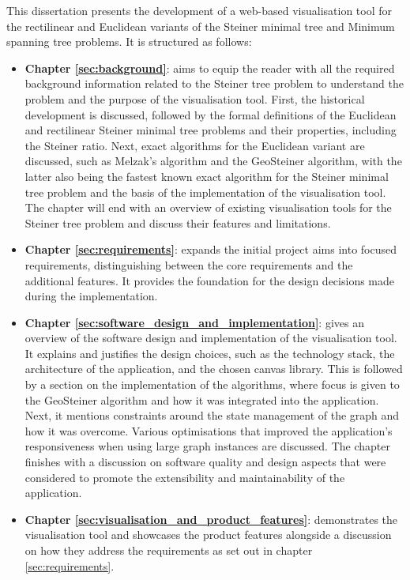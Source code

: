 \documentclass{l4proj}
\begin{document}
This dissertation presents the development of a web-based visualisation tool for the rectilinear and Euclidean variants of the Steiner minimal tree and Minimum spanning tree problems. It is structured as follows:
\begin{itemize}
    \item \textbf{Chapter \ref{sec:background}}: aims to equip the reader with all the required background information related to the Steiner tree problem to understand the problem and the purpose of the visualisation tool. First, the historical development is discussed, followed by the formal definitions of the Euclidean and rectilinear Steiner minimal tree problems and their properties, including the Steiner ratio. Next, exact algorithms for the Euclidean variant are discussed, such as Melzak's algorithm and the GeoSteiner algorithm, with the latter also being the fastest known exact algorithm for the Steiner minimal tree problem and the basis of the implementation of the visualisation tool. The chapter will end with an overview of existing visualisation tools for the Steiner tree problem and discuss their features and limitations.
    \item \textbf{Chapter \ref{sec:requirements}}: expands the initial project aims into focused requirements, distinguishing between the core requirements and the additional features. It provides the foundation for the design decisions made during the implementation.
    \item \textbf{Chapter \ref{sec:software_design_and_implementation}}: gives an overview of the software design and implementation of the visualisation tool. It explains and justifies the design choices, such as the technology stack, the architecture of the application, and the chosen canvas library. This is followed by a section on the implementation of the algorithms, where focus is given to the GeoSteiner algorithm and how it was integrated into the application. Next, it mentions constraints around the state management of the graph and how it was overcome. Various optimisations that improved the application's responsiveness when using large graph instances are discussed. The chapter finishes with a discussion on software quality and design aspects that were considered to promote the extensibility and maintainability of the application.
    \item \textbf{Chapter \ref{sec:visualisation_and_product_features}}: demonstrates the visualisation tool and showcases the product features alongside a discussion on how they address the requirements as set out in chapter \ref{sec:requirements}.

\end{itemize}
\end{document}
